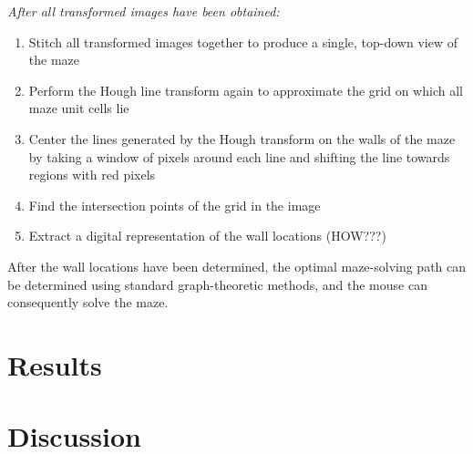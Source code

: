 \documentclass[10pt,twocolumn,letterpaper]{article}
\begin{document}
\textit{After all transformed images have been obtained:}
\begin{enumerate}
	\item Stitch all transformed images together to produce a single, top-down view of the maze
	\item Perform the Hough line transform again to approximate the grid on which all maze unit cells lie
	\item Center the lines generated by the Hough transform on the walls of the maze by taking a window of pixels around each line and shifting the line towards regions with red pixels
	\item Find the intersection points of the grid in the image
	\item Extract a digital representation of the wall locations (HOW???)
\end{enumerate}

After the wall locations have been determined, the optimal maze-solving path can be determined using standard graph-theoretic methods, and the mouse can consequently solve the maze.
\section{Results}
\label{sec:results}

\section{Discussion}
\label{sec:discussion}

{\small


}
\end{document}
